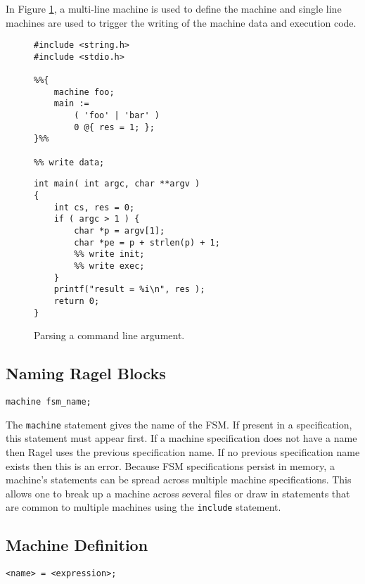 \documentclass[letterpaper,11pt,oneside]{book}
\newcommand{\verbspace}{\vspace{10pt}}
\begin{document}
In Figure \ref{cmd-line-parsing}, a multi-line machine is used to define the
machine and single line machines are used to trigger the writing of the machine
data and execution code.

\begin{figure}
\begin{multicols}{2}
\small
\begin{verbatim}
#include <string.h>
#include <stdio.h>

%%{ 
    machine foo;
    main := 
        ( 'foo' | 'bar' ) 
        0 @{ res = 1; };
}%%

%% write data;
\end{verbatim}
\columnbreak
\begin{verbatim}
int main( int argc, char **argv )
{
    int cs, res = 0;
    if ( argc > 1 ) {
        char *p = argv[1];
        char *pe = p + strlen(p) + 1;
        %% write init;
        %% write exec;
    }
    printf("result = %i\n", res );
    return 0;
}
\end{verbatim}
\end{multicols}
\caption{Parsing a command line argument.}
\label{cmd-line-parsing}
\end{figure}

\subsection{Naming Ragel Blocks}

\begin{verbatim}
machine fsm_name;
\end{verbatim}
\verbspace

The \verb|machine| statement gives the name of the FSM. If present in a
specification, this statement must appear first. If a machine specification
does not have a name then Ragel uses the previous specification name.  If no
previous specification name exists then this is an error. Because FSM
specifications persist in memory, a machine's statements can be spread across
multiple machine specifications.  This allows one to break up a machine across
several files or draw in statements that are common to multiple machines using
the \verb|include| statement.

\subsection{Machine Definition}
\label{definition}

\begin{verbatim}
<name> = <expression>;
\end{verbatim}
\verbspace
\end{document}
